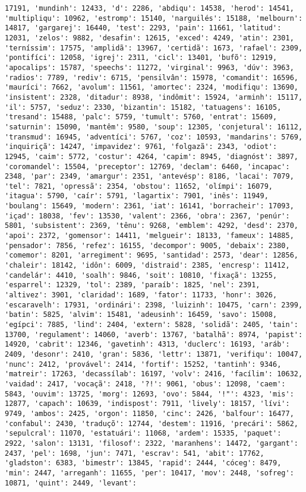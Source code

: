 \documentclass[11pt]{article}
\begin{document}
\begin{Verbatim}[commandchars=\\\{\}]
17191, 'mundinh': 12433, 'd': 2286, 'abdiqu': 14538, 'herod': 14541, 'multipliqu': 10962, 'estromp': 15140, 'narguilés': 15188, 'melbourn': 14817, 'gargarej': 16440, 'test': 2293, 'pain': 11661, 'latitud': 12031, 'zelos': 9882, 'desafin': 12615, 'exced': 4249, 'atin': 2301, 'terníssim': 17575, 'amplidã': 13967, 'certidã': 1673, 'rafael': 2309, 'pontifíci': 12058, 'igrej': 2311, 'cicl': 13401, 'bufõ': 12919, 'apocalips': 15787, 'speechs': 11272, 'virginal': 9963, 'dúv': 3963, 'radios': 7789, 'rediv': 6715, 'pensilvân': 15978, 'comandit': 16596, 'mauríci': 7662, 'avolum': 11561, 'amortec': 2324, 'modifiqu': 13690, 'insistent': 2328, 'ditadur': 8938, 'indômit': 15924, 'arminh': 15117, 'il': 5757, 'seduz': 2330, 'bizantin': 15182, 'tatuagens': 16105, 'tresand': 15488, 'palc': 5759, 'tumult': 5760, 'entrat': 15609, 'saturnin': 15090, 'mantêm': 9580, 'soup': 12305, 'conjetural': 16112, 'transmud': 16945, 'adventíci': 5767, 'coz': 10593, 'mandarins': 5769, 'inquiriçã': 14247, 'impavidez': 9761, 'folgazã': 2343, 'odiot': 12945, 'caim': 5772, 'costur': 4264, 'capim': 8945, 'diagnóst': 3897, 'coromandel': 15504, 'preceptor': 12769, 'declam': 6460, 'incapac': 2348, 'par': 2349, 'amargur': 2351, 'antevésp': 8186, 'lacai': 7079, 'tel': 7821, 'opressã': 2354, 'obstou': 11652, 'olímpi': 16079, 'itagua': 5790, 'caír': 5791, 'lagartix': 7901, 'inês': 11949, 'boulang': 15649, 'modern': 2361, 'iat': 16141, 'borracheir': 17093, 'içad': 18038, 'fev': 13530, 'valent': 2366, 'obra': 2367, 'penúr': 5801, 'subsistent': 2369, 'tênu': 9268, 'emblem': 4292, 'desd': 2370, 'apoi': 2372, 'gomensor': 14411, 'melgueir': 18133, 'fameux': 14885, 'pensador': 7856, 'refez': 16155, 'decompor': 9005, 'debaix': 2380, 'comemor': 8201, 'arregiment': 9695, 'santidad': 2573, 'dear': 12856, 'chaleir': 18142, 'idôn': 6009, 'distraid': 2385, 'encresp': 11412, 'candelár': 4410, 'soalh': 9846, 'soit': 10810, 'fixaçã': 13255, 'esparrel': 12329, 'tol': 2389, 'paraíb': 1825, 'nel': 2391, 'altivez': 3901, 'claridad': 1689, 'fator': 11733, 'honr': 3026, 'escaravelh': 17931, 'ordinári': 2398, 'luizinh': 10475, 'carn': 2399, 'batin': 5825, 'alvim': 15481, 'adeusinh': 16459, 'savo': 15008, 'egípci': 7885, 'lind': 2404, 'extern': 5828, 'solidã': 2405, 'tain': 13700, 'regulament': 14060, 'averb': 13767, 'batalhã': 8974, 'papist': 14920, 'cabrit': 12346, 'gavetinh': 4313, 'duclerc': 16193, 'aráb': 2409, 'desonr': 2410, 'gran': 5836, 'lettr': 13871, 'verifiqu': 10047, 'nunc': 2412, 'provável': 2414, 'fortif': 15252, 'tantinh': 9346, 'matreir': 17263, 'decassílab': 16197, 'volv': 2416, 'facílim': 10632, 'vaidad': 2417, 'vocaçã': 2418, '?!': 9061, 'obus': 12098, 'caem': 5843, 'ouvim': 13725, 'morg': 12693, 'ovo': 5844, '!"': 4323, 'mis': 12877, 'capach': 10639, 'indispost': 7911, 'lively': 18157, 'lívi': 9749, 'ambos': 2425, 'orgon': 11850, 'cinc': 2426, 'balfour': 16477, 'confabul': 2430, 'traduçõ': 12744, 'destem': 11916, 'precári': 5862, 'sepulcral': 11070, 'estatuári': 11068, 'ardem': 15335, 'paquet': 2922, 'salon': 13131, 'filosof': 2322, 'maranhens': 14472, 'gargant': 2437, 'pel': 1698, 'jun': 7471, 'escrav': 541, 'abit': 17762, 'gladston': 6383, 'bimestr': 13845, 'rapid': 2444, 'cóceg': 8479, 'min': 2447, 'arreganh': 11655, 'per': 10417, 'mov': 2448, 'sofreg': 10871, 'quint': 2449, 'levant': 
\end{Verbatim}
\end{document}
